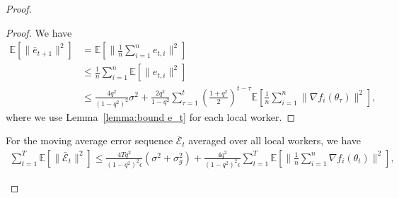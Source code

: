 \documentclass[11pt]{article}
\begin{document}
\begin{proof}
\begin{proof}
We have
\begin{align*}
    \mathbb E[\|\bar e_{t+1}\|^2]&=\mathbb E[\|\frac{1}{n}\sum_{i=1}^n e_{t,i}\|^2]\\
    &\leq \frac{1}{n} \sum_{i=1}^n \mathbb E[\|e_{t,i}\|^2]\\
    &\leq \frac{4q^2}{(1-q^2)^2}\sigma^2+\frac{2q^2}{1-q^2}\sum_{\tau=1}^t (\frac{1+q^2}{2})^{t-\tau} \mathbb E[\frac{1}{n}\sum_{i=1}^n \|\nabla f_i(\theta_{\tau})\|^2],
\end{align*}
where we use Lemma~\ref{lemma:bound e_t} for each local worker.
\end{proof}

\begin{Lemma} \label{lemma:bound big E_t dist}
For the moving average error sequence $\bar{\mathcal E}_t$ averaged over all local workers, we have
\begin{align*}
    \sum_{t=1}^T \mathbb E[\|\bar{\mathcal E}_t\|^2]\leq \frac{4Tq^2}{(1-q^2)^2\epsilon}(\sigma^2+\sigma_g^2) + \frac{4q^2}{(1-q^2)^2\epsilon} \sum_{t=1}^T \mathbb E[\|\frac{1}{n}\sum_{i=1}^n \nabla f_i(\theta_t)\|^2],
\end{align*}
\end{Lemma}


\end{proof}
\end{document}

